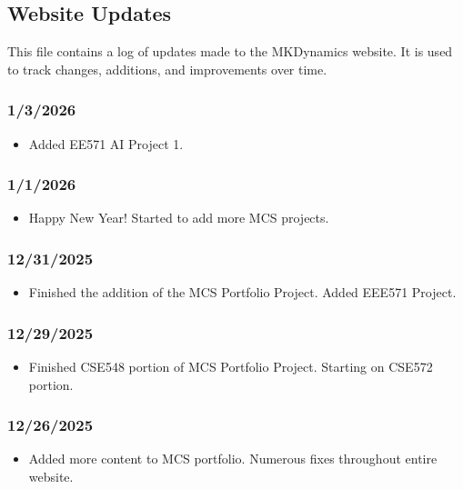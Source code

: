 \subsection{Website Updates}

This file contains a log of updates made to the MKDynamics website. It is used to track changes, additions, and improvements over time.

\subsubsection{1/3/2026}

\begin{itemize}
\item Added EE571 AI Project 1.
\end{itemize}

\subsubsection{1/1/2026}

\begin{itemize}
\item Happy New Year!  Started to add more MCS projects.
\end{itemize}

\subsubsection{12/31/2025}

\begin{itemize}
\item Finished the addition of the MCS Portfolio Project.  Added EEE571 Project.
\end{itemize}

\subsubsection{12/29/2025}

\begin{itemize}
\item Finished CSE548 portion of MCS Portfolio Project.  Starting on CSE572 portion.
\end{itemize}

\subsubsection{12/26/2025}

\begin{itemize}
\item Added more content to MCS portfolio.  Numerous fixes throughout entire website.
\end{itemize}

